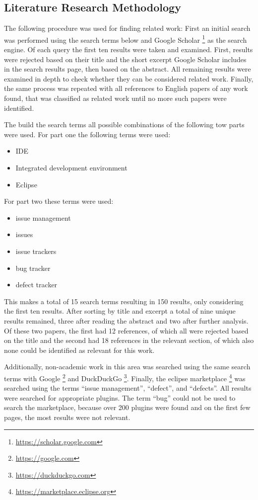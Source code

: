 \subsection{Literature Research Methodology} 
\label{ssec:ch2:ss2.1}
The following procedure was used for finding related work:
First an initial search was performed using the search terms below and Google Scholar \footnote{\url{https://scholar.google.com}} as the search engine.
Of each query the first ten results were taken and examined.
First, results were rejected based on their title and the short excerpt Google Scholar includes in the search results page, 
then based on the abstract.
All remaining results were examined in depth to check whether they can be considered related work.
Finally, the same process was repeated with all references to English papers of any work found, 
that was classified as related work until no more such papers were identified.

The build the search terms all possible combinations of the following tow parts were used.
For part one the following terms were used:
\begin{itemize}
	\item IDE
	\item Integrated development environment
	\item Eclipse
\end{itemize}

For part two these terms were used:

\begin{itemize}
	\item issue management
	\item issues
	\item issue trackers
	\item bug tracker
	\item defect tracker
\end{itemize}

This makes a total of 15 search terms resulting in 150 results, only considering the first ten results.
After sorting by title and excerpt a total of nine unique results remained, three after reading the abstract and two after further analysis.
Of these two papers, the first had 12 references, of which all were rejected based on the title and the second had 18 references in the relevant section, of which also none could be identified as relevant for this work.

Additionally, non-academic work in this area was searched using the same search terms with Google \footnote{\url{https://google.com}} and DuckDuckGo \footnote{\url{https://duckduckgo.com}}.
Finally, the eclipse marketplace \footnote{\url{https://marketplace.eclipse.org}} was searched using the terms ``issue management'', ``defect'', and ``defects''. 
All results were searched for appropriate plugins.
The term ``bug'' could not be used to search the marketplace, because over 200 plugins were found and on the first few pages, the most results were not relevant.

